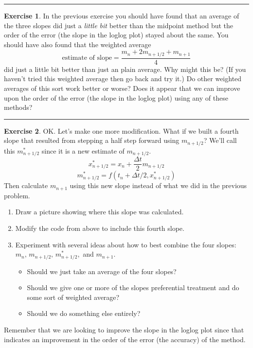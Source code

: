 \documentclass[
]{book}
\providecommand{\tightlist}{%
  \setlength{\itemsep}{0pt}\setlength{\parskip}{0pt}}
\theoremstyle{definition}
\theoremstyle{definition}
\theoremstyle{definition}
\newtheorem{exercise}{Exercise}[chapter]
\theoremstyle{remark}
\begin{document}
\begin{center}\rule{0.5\linewidth}{0.5pt}\end{center}

\begin{exercise}
\protect\hypertarget{exr:unnamed-chunk-452}{}{\label{exr:unnamed-chunk-452} }In the previous exercise you should have found that an average of the three slopes did just a \emph{little bit} better than the midpoint method but the order of the error (the slope in the loglog plot) stayed about the same. You should have also found that the weighted average
\[ \text{estimate of slope} = \frac{m_n + 2m_{n+1/2} + m_{n+1}}{4} \]
did just a little bit better than just an plain average. Why might this be? (If you haven't tried this weighted average then go back and try it.) Do other weighted averages of this sort work better or worse? Does it appear that we can improve upon the order of the error (the slope in the loglog plot) using any of these methods?
\end{exercise}

\begin{center}\rule{0.5\linewidth}{0.5pt}\end{center}

\begin{exercise}
\protect\hypertarget{exr:unnamed-chunk-453}{}{\label{exr:unnamed-chunk-453} }OK. Let's make one more modification. What if we built a fourth slope that resulted from stepping a half step forward using \(m_{n+1/2}\)? We'll call this \(m_{n+1/2}^*\) since it is a new estimate of \(m_{n+1/2}\).
\[ x_{n+1/2}^* = x_n + \frac{\Delta t}{2} m_{n+1/2} \]
\[ m_{n+1/2}^* = f(t_n + \Delta t/2, x_{n+1/2}^*) \]
Then calculate \(m_{n+1}\) using this new slope instead of what we did in the previous problem.

\begin{enumerate}
\def\labelenumi{\alph{enumi}.}
\tightlist
\item
  Draw a picture showing where this slope was calculated.
\item
  Modify the code from above to include this fourth slope.\\
\item
  Experiment with several ideas about how to best combine the four slopes: \(m_n, \, m_{n+1/2}, \, m_{n+1/2}^*,\) and \(m_{n+1}\).

  \begin{itemize}
  \tightlist
  \item
    Should we just take an average of the four slopes?
  \item
    Should we give one or more of the slopes preferential treatment and do some sort of weighted average?
  \item
    Should we do something else entirely?
  \end{itemize}
\end{enumerate}

Remember that we are looking to improve the slope in the loglog plot since that indicates an improvement in the order of the error (the accuracy) of the method.
\end{exercise}
\end{document}
